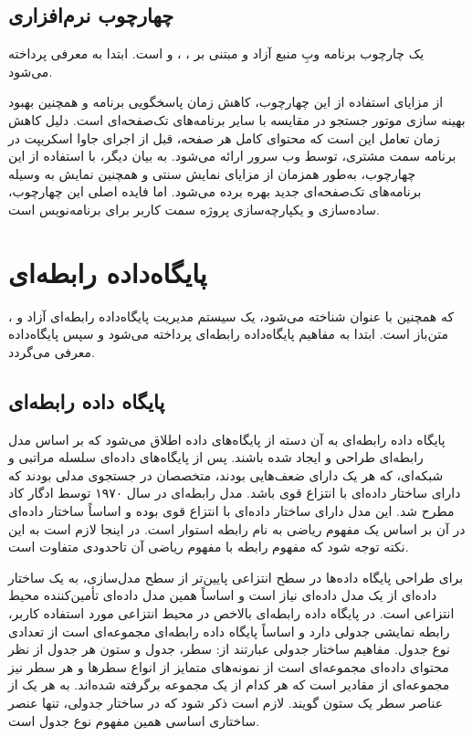 {\subsection{چهارچوب نرم‌افزاری }
\cite{Nuxt} یک چارچوب برنامه وبِ منبع آزاد و مبتنی بر  ،  ،  و  است.
  ابتدا به معرفی  پرداخته می‌شود.

از مزایای استفاده از این چهارچوب، کاهش زمان پاسخگویی برنامه و همچنین بهبود بهینه سازی موتور جستجو در مقایسه با سایر برنامه‌های تک‌صفحه‌ای است. دلیل کاهش زمان تعامل این است که محتوای کامل هر صفحه، قبل از اجرای جاوا اسکریپت در برنامه سمت مشتری، توسط وب سرور ارائه می‌شود. به بیان دیگر، با استفاده از این چهارچوب، به‌طور همزمان از مزایای نمایش سنتی  و همچنین نمایش به وسیله برنامه‌های تک‌صفحه‌ای جدید بهره برده می‌شود.
اما فایده اصلی این چهارچوب، ساده‌سازی و یکپارچه‌سازی پروژه سمت کاربر برای برنامه‌نویس است.


\section{پایگاه‌داده رابطه‌ای }
\cite{Postgress}، که همچنین با عنوان  شناخته می‌شود، یک سیستم مدیریت پایگاه‌داده رابطه‌ای آزاد و متن‌باز است. ابتدا به مفاهیم پایگاه‌داده رابطه‌ای پرداخته می‌شود و سپس پایگاه‌داده  معرفی می‌گردد.
 
\subsection{پایگاه داده رابطه‌ای}
پایگاه داده رابطه‌ای به آن دسته از پایگاه‌های داده اطلاق می‌شود که بر اساس مدل رابطه‌ای طراحی و ایجاد شده باشند. پس از پایگاه‌های داده‌ای سلسله مراتبی و شبکه‌ای، که هر یک دارای ضعف‌هایی بودند، متخصصان در جستجوی مدلی بودند که دارای ساختار داده‌ای با انتزاع قوی باشد. مدل رابطه‌ای در سال ۱۹۷۰ توسط ادگار کاد مطرح شد. این مدل دارای ساختار داده‌ای با انتزاع قوی بوده و اساساً ساختار داده‌ای در آن بر اساس یک مفهوم ریاضی به نام رابطه استوار است. در اینجا لازم است به این نکته توجه شود که مفهوم رابطه با مفهوم ریاضی آن تاحدودی متفاوت است.
 
برای طراحی پایگاه داده‌ها در سطح انتزاعی پایین‌تر از سطح مدل‌سازی، به یک ساختار داده‌ای از یک مدل داده‌ای نیاز است و اساساً همین مدل داده‌ای تأمین‌کننده محیط انتزاعی است. در پایگاه داده رابطه‌ای بالاخص در محیط انتزاعی مورد استفاده کاربر، رابطه نمایشی جدولی دارد و اساساً پایگاه داده رابطه‌ای مجموعه‌ای است از تعدادی نوع جدول. مفاهیم ساختار جدولی عبارتند از: سطر، جدول و ستون
هر جدول از نظر محتوای داده‌ای مجموعه‌ای است از نمونه‌های متمایز از انواع سطرها و هر سطر نیز مجموعه‌ای از مقادیر است که هر کدام از یک مجموعه برگرفته شده‌اند. به هر یک از عناصر سطر یک ستون گویند. لازم است ذکر شود که در ساختار جدولی، تنها عنصر ساختاری اساسی همین مفهوم نوع جدول است.
 
}
